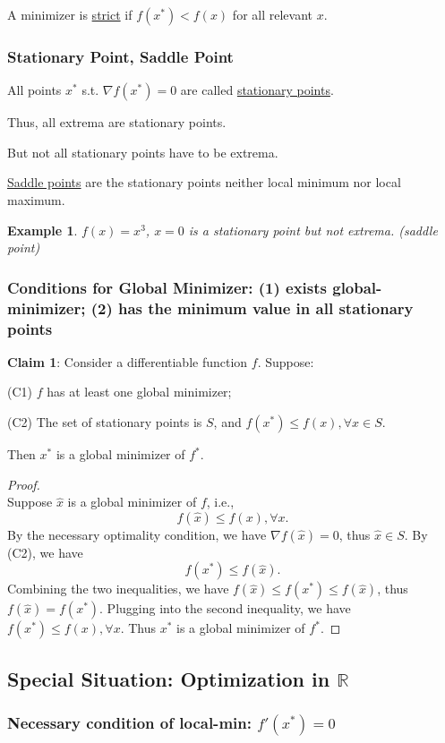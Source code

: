 \documentclass[11pt,a4paper]{article}
\newtheorem{example}{Example}
\begin{document}
A minimizer is \underline{strict} if $f(x^*)< f(x)$ for all relevant $x$.

\subsubsection{Stationary Point, Saddle Point}
All points $x^*$ s.t. $\nabla f(x^*)=0$ are called \underline{stationary points}.

Thus, all extrema are stationary points.

But not all stationary points have to be extrema.

\underline{Saddle points} are the stationary points neither local minimum nor local maximum.

\begin{example}
$f(x)=x^3$, $x=0$ is a stationary point but not extrema. (saddle point)
\end{example}

\subsubsection{ Conditions for Global Minimizer: (1) exists global-minimizer; (2) has the minimum value in all stationary points}
\textbf{Claim 1}: Consider a differentiable function $f$. Suppose:

(C1) $f$ has at least one global minimizer;

(C2) The set of stationary points is $S$, and $f\left(x^{*}\right) \leq f(x), \forall x \in S$.

Then $x^{*}$ is a global minimizer of $f^{*}$.
\begin{proof}
\quad\\
Suppose $\hat{x}$ is a global minimizer of $f$, i.e.,
$$
f(\hat{x}) \leq f(x), \forall x .
$$
By the necessary optimality condition, we have $\nabla f(\hat{x})=0$, thus $\hat{x} \in S$. By (C2), we have
$$
f\left(x^{*}\right) \leq f(\hat{x}) .
$$
Combining the two inequalities, we have $f(\hat{x}) \leq f\left(x^{*}\right) \leq f(\hat{x})$, thus $f(\hat{x})=f\left(x^{*}\right)$. Plugging into the second inequality, we have $f\left(x^{*}\right) \leq f(x), \forall x$. Thus $x^{*}$ is a global minimizer of $f^{*} .$
\end{proof}

\subsection{Special Situation: Optimization in $\mathbb{R}$}
\subsubsection{ Necessary condition of local-min: $f'(x^*)=0$}
\end{document}
